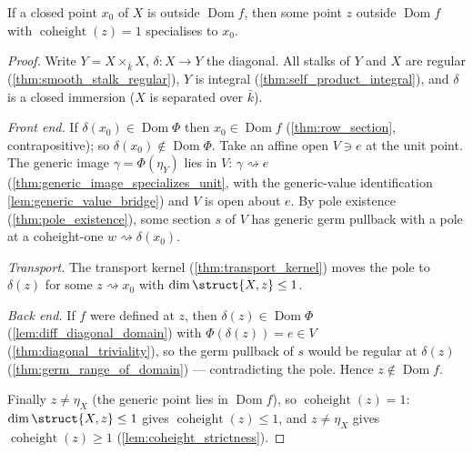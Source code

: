 \begin{theorem}
  \label{thm:transport_assembly}
  \leanok
  If a closed point \(x_0\) of \(X\) is outside \(\operatorname{Dom} f\), then
  some point \(z\) outside \(\operatorname{Dom} f\) with
  \(\operatorname{coheight}(z) = 1\) specialises to \(x_0\).
\end{theorem}
\begin{proof}
  \leanok
  Write \(Y = X \times_{\bar k} X\), \(\delta : X \to Y\) the diagonal. All
  stalks of \(Y\) and \(X\) are regular (\ref{thm:smooth_stalk_regular}), \(Y\)
  is integral (\ref{thm:self_product_integral}), and \(\delta\) is a closed
  immersion (\(X\) is separated over \(\bar k\)).

  \emph{Front end.} If \(\delta(x_0) \in \operatorname{Dom}\Phi\) then \(x_0 \in
  \operatorname{Dom} f\) (\ref{thm:row_section}, contrapositive); so
  \(\delta(x_0) \notin \operatorname{Dom}\Phi\). Take an affine open \(V \ni e\)
  at the unit point. The generic image \(\gamma = \Phi(\eta_Y)\) lies in \(V\):
  \(\gamma \rightsquigarrow e\) (\ref{thm:generic_image_specializes_unit}, with
  the generic-value identification \ref{lem:generic_value_bridge}) and \(V\) is
  open about \(e\). By pole existence (\ref{thm:pole_existence}), some section
  \(s\) of \(V\) has generic germ pullback with a pole at a coheight-one
  \(w \rightsquigarrow \delta(x_0)\).

  \emph{Transport.} The transport kernel (\ref{thm:transport_kernel}) moves the
  pole to \(\delta(z)\) for some \(z \rightsquigarrow x_0\) with
  \(\dim\struct{X,z} \le 1\).

  \emph{Back end.} If \(f\) were defined at \(z\), then \(\delta(z) \in
  \operatorname{Dom}\Phi\) (\ref{lem:diff_diagonal_domain}) with \(\Phi(\delta(z))
  = e \in V\) (\ref{thm:diagonal_triviality}), so the germ pullback of \(s\)
  would be regular at \(\delta(z)\) (\ref{thm:germ_range_of_domain}) ---
  contradicting the pole. Hence \(z \notin \operatorname{Dom} f\).

  Finally \(z \neq \eta_X\) (the generic point lies in \(\operatorname{Dom} f\)),
  so \(\operatorname{coheight}(z) = 1\): \(\dim\struct{X,z} \le 1\) gives
  \(\operatorname{coheight}(z) \le 1\), and \(z \neq \eta_X\) gives
  \(\operatorname{coheight}(z) \ge 1\) (\ref{lem:coheight_strictness}).
\end{proof}

